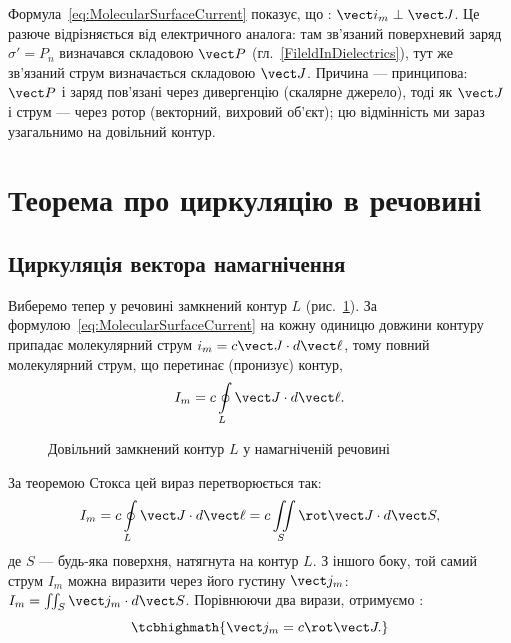 \begin{Attention}
	Формула~\eqref{eq:MolecularSurfaceCurrent} показує, що : $\vect i_m \perp \vect
	J$. Це разюче відрізняється від електричного аналога: там зв'язаний поверхневий заряд $\sigma' = P_n$ визначався 
	складовою $\vect P$ (гл.~\ref{FileldInDielectrics}), тут же зв'язаний струм визначається  складовою $\vect J$. Причина
	--- принципова: $\vect P$ і заряд пов'язані через дивергенцію (скалярне джерело), тоді як $\vect J$ і струм --- через ротор (векторний,
	вихровий об'єкт); цю відмінність ми зараз узагальнимо на довільний контур.
\end{Attention}

\section{Теорема про циркуляцію в речовині}

\subsection*{Циркуляція вектора намагнічення}

Виберемо тепер у речовині  замкнений контур $L$ (рис.~\ref{pic:Jloop}). За формулою~\eqref{eq:MolecularSurfaceCurrent} на кожну
одиницю довжини контуру припадає молекулярний струм $i_m = c\vect J\cdot d\vect\ell$, тому повний молекулярний струм, що перетинає (пронизує)
контур,
\begin{equation}\label{eq:CirculationJ}
	I_m = c\oint\limits_L \vect J\cdot d\vect\ell.
\end{equation}

\begin{figure}\centering
	\caption{Довільний замкнений контур $L$ у намагніченій речовині\label{pic:Jloop}}
\end{figure}

За теоремою Стокса цей вираз перетворюється так:
\begin{equation*}
	I_m = c\oint\limits_L \vect J\cdot d\vect\ell = c\iint\limits_S \rot\vect J\cdot d\vect S,
\end{equation*}
де $S$ --- будь-яка поверхня, натягнута на контур $L$. З іншого боку, той самий струм $I_m$ можна виразити через його  густину
$\vect j_m$: $I_m = \iint_S \vect j_m\cdot d\vect S$. Порівнюючи два вирази, отримуємо :
\begin{equation}\label{eq:MolecularCurrentDensity}
	\tcbhighmath{
		\vect j_m = c\rot\vect J.
	}
\end{equation}

